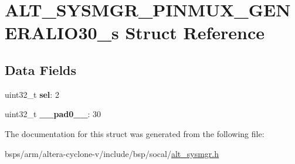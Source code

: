 \hypertarget{structALT__SYSMGR__PINMUX__GENERALIO30__s}{}\section{A\+L\+T\+\_\+\+S\+Y\+S\+M\+G\+R\+\_\+\+P\+I\+N\+M\+U\+X\+\_\+\+G\+E\+N\+E\+R\+A\+L\+I\+O30\+\_\+s Struct Reference}
\label{structALT__SYSMGR__PINMUX__GENERALIO30__s}
\subsection*{Data Fields}
\begin{DoxyCompactItemize}
\item 
\mbox{\label{structALT__SYSMGR__PINMUX__GENERALIO30__s_ae757d95a3edd40a5854975e593e0be0c}} 
uint32\+\_\+t {\bfseries sel}\+: 2
\item 
\mbox{\label{structALT__SYSMGR__PINMUX__GENERALIO30__s_a884c3734fd46de29689840286c61292c}} 
uint32\+\_\+t {\bfseries \+\_\+\+\_\+pad0\+\_\+\+\_\+}\+: 30
\end{DoxyCompactItemize}


The documentation for this struct was generated from the following file\+:\begin{DoxyCompactItemize}
\item 
bsps/arm/altera-\/cyclone-\/v/include/bsp/socal/\mbox{\hyperlink{alt__sysmgr_8h}{alt\+\_\+sysmgr.\+h}}\end{DoxyCompactItemize}
